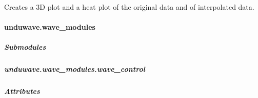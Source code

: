\documentclass[letterpaper,10pt,english]{sphinxmanual}
\begin{document}
\begin{fulllineitems}
\begin{fulllineitems}
\sphinxAtStartPar
Creates a 3D plot and a heat plot of the original data and of interpolated data.

\end{fulllineitems}


\begin{fulllineitems}
\label{\detokenize{autoapi/unduwave/quantities/quantities/index:unduwave.quantities.quantities.wave_quantity.save_plot}}
\pysigstartsignatures
{}
\pysigstopsignatures
\end{fulllineitems}


\end{fulllineitems}


\sphinxstepscope


\paragraph{unduwave.wave\_modules}
\label{\detokenize{autoapi/unduwave/wave_modules/index:module-unduwave.wave_modules}}\label{\detokenize{autoapi/unduwave/wave_modules/index:unduwave-wave-modules}}\label{\detokenize{autoapi/unduwave/wave_modules/index::doc}}

\subparagraph{Submodules}
\label{\detokenize{autoapi/unduwave/wave_modules/index:submodules}}
\sphinxstepscope


\subparagraph{unduwave.wave\_modules.wave\_control}
\label{\detokenize{autoapi/unduwave/wave_modules/wave_control/index:module-unduwave.wave_modules.wave_control}}\label{\detokenize{autoapi/unduwave/wave_modules/wave_control/index:unduwave-wave-modules-wave-control}}\label{\detokenize{autoapi/unduwave/wave_modules/wave_control/index::doc}}

\subparagraph{Attributes}
\label{\detokenize{autoapi/unduwave/wave_modules/wave_control/index:attributes}}
\end{document}
